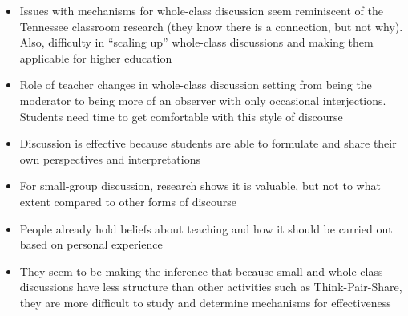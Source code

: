 \documentclass{TC}
\begin{document}
\begin{itemize}
\begin{itemize}
	\item Issues with mechanisms for whole-class discussion seem reminiscent of the Tennessee classroom research (they know there is a connection, but not why). Also, difficulty in “scaling up” whole-class discussions and making them applicable for higher education
	\item Role of teacher changes in whole-class discussion setting from being the moderator to being more of an observer with only occasional interjections. Students need time to get comfortable with this style of discourse
	\item Discussion is effective because students are able to formulate and share their own perspectives and interpretations
	\item For small-group discussion, research shows it is valuable, but not to what extent compared to other forms of discourse
	\item People already hold beliefs about teaching and how it should be carried out based on personal experience
	\item They seem to be making the inference that because small and whole-class discussions have less structure than other activities such as Think-Pair-Share, they are more difficult to study and determine mechanisms for effectiveness
	\end{itemize}


\end{itemize}
\end{document}

